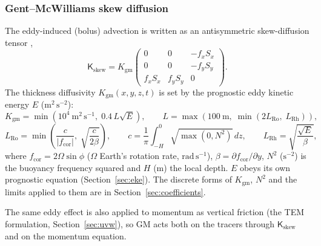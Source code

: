 \documentclass{article}
\begin{document}
\subsubsection*{Gent--McWilliams skew diffusion}
The eddy-induced (bolus) advection \citep{gentmcwilliams1990} is written as an antisymmetric skew-diffusion tensor \citep{gent1995},
\[
\mathsf{K}_\text{skew} = K_\text{gm}
\begin{pmatrix}
0 & 0 & -f_x S_x \\
0 & 0 & -f_y S_y \\
f_x S_x & f_y S_y & 0
\end{pmatrix}.
\]
The thickness diffusivity $K_\text{gm}(x,y,z,t)$ is set by the prognostic eddy kinetic energy $E$ ($\text{m}^2\,\text{s}^{-2}$):
\[
K_\text{gm} = \min\!\left( 10^4~\text{m}^2\,\text{s}^{-1},\; 0.4\, L \sqrt{E} \right),
\qquad
L = \max\!\left( 100~\text{m},\; \min\!\left( 2 L_\text{Ro},\; L_\text{Rh} \right) \right),
\]
\[
L_\text{Ro} = \min\!\left( \frac{c}{|f_\text{cor}|},\; \sqrt{\frac{c}{2\beta}} \right),
\qquad
c = \frac{1}{\pi} \int_{-H}^{0} \sqrt{\max(0, N^2)}\, dz,
\qquad
L_\text{Rh} = \sqrt{\frac{\sqrt{E}}{\beta}},
\]
where $f_\text{cor} = 2\Omega\sin\phi$ ($\Omega$ Earth's rotation rate, $\text{rad}\,\text{s}^{-1}$), $\beta = \partial f_\text{cor}/\partial y$, $N^2$ ($\text{s}^{-2}$) is the buoyancy frequency squared and $H$ ($\text{m}$) the local depth.
$E$ obeys its own prognostic equation (Section~\ref{sec:eke}).
The discrete forms of $K_\text{gm}$, $N^2$ and the limits applied to them are in Section~\ref{sec:coefficients}.

The same eddy effect is also applied to momentum as vertical friction (the TEM formulation, Section~\ref{sec:uvw}), so GM acts both on the tracers through $\mathsf{K}_\text{skew}$ and on the momentum equation.
\end{document}
